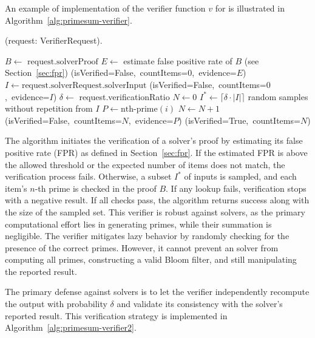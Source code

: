 \documentclass[sigconf, nonacm]{acmart}
\begin{document}
An example of implementation of the verifier function $v$ for  is illustrated in Algorithm~\ref{alg:primesum-verifier}.

\begin{algorithm}
  \caption{(request: VerifierRequest).}
  \label{alg:primesum-verifier}
  \begin{algorithmic}[1]
    \STATE $B \leftarrow \mbox{ request.solverProof}$
    \STATE $E \leftarrow$ estimate false positive rate of $B$ (see Section~\ref{sec:fpr})
    \RETURN \mbox{(isVerified=False, countItems=$0$, evidence=$E$)}
    \ENDIF
    \STATE $I \leftarrow \mbox{request.solverRequest.solverInput}$
    \RETURN \mbox{(isVerified=False, countItems=$0$, evidence=$I$)}
    \ENDIF
    \STATE $\delta \leftarrow$ \mbox{request.verificationRatio}
    \STATE $N \leftarrow 0$
    \STATE $I^* \leftarrow \lceil  \delta \cdot |I| \rceil$ random samples without repetition from $I$
    \STATE $P \leftarrow \mbox{nth-prime}(i)$
    \STATE $N \leftarrow N + 1$
    \RETURN \mbox{(isVerified=False, countItems=$N$, evidence=$P$)}
    \ENDIF
    \ENDFOR
    \RETURN \mbox{(isVerified=True, countItems=$N$)}
  \end{algorithmic}
\end{algorithm}

The  algorithm initiates the verification of a solver's proof by estimating its false positive rate (FPR) as defined in Section~\ref{sec:fpr}. If the estimated FPR is above the allowed threshold or the expected number of items does not match, the verification process fails. Otherwise, a subset $I^*$ of inputs is sampled, and each item's $n$-th prime is checked in the proof $B$. If any lookup fails, verification stops with a negative result. If all checks pass, the algorithm returns success along with the size of the sampled set.
This verifier is robust against  solvers, as the primary computational effort lies in generating primes, while their summation is negligible. The verifier mitigates lazy behavior by randomly checking for the presence of the correct primes. However, it cannot prevent an  solver from computing all primes, constructing a valid Bloom filter, and still manipulating the reported result.

The primary defense against  solvers is to let the verifier independently recompute the output with probability $\delta$ and validate its consistency with the solver's reported result. This verification strategy is implemented in Algorithm~\ref{alg:primesum-verifier2}.
\end{document}
